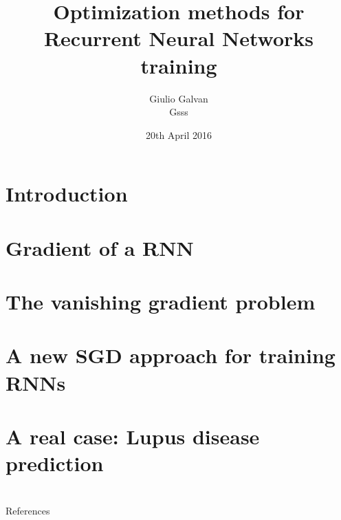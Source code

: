 \documentclass[xcolor=dvipsnames,10pt]{beamer}
\title{Optimization methods for Recurrent Neural Networks training}
\date{20th April 2016}
\author{Giulio Galvan\\ Gsss }
\institute{Università degli studi di Firenze}
\begin{document}
\frame{\titlepage}
\section{Introduction}

\section{Gradient of a RNN}

\section{The vanishing gradient problem}

%
\section{A new SGD approach for training RNNs}

\section{A real case: Lupus disease prediction}


\section{}
\begin{frame}[allowframebreaks]{References}
	
	
\end{frame}
\end{document}
